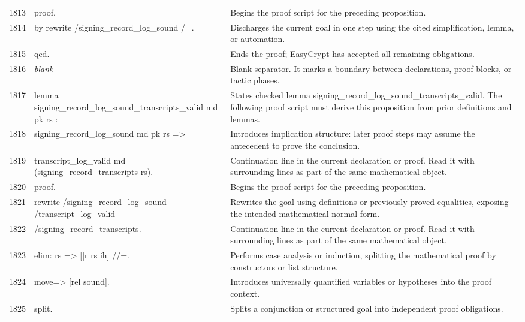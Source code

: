 \documentclass[10pt]{article}
\begin{document}
\begin{longtable}{r L{0.53\textwidth} L{0.37\textwidth}}
1813 & {\ttfamily\scriptsize proof.} & Begins the proof script for the preceding proposition. \\
1814 & {\ttfamily\scriptsize by rewrite /signing\_record\_log\_sound /=.} & Discharges the current goal in one step using the cited simplification, lemma, or automation. \\
1815 & {\ttfamily\scriptsize qed.} & Ends the proof; EasyCrypt has accepted all remaining obligations. \\
1816 & {\ttfamily\scriptsize \emph{blank}} & Blank separator.  It marks a boundary between declarations, proof blocks, or tactic phases. \\
1817 & {\ttfamily\scriptsize lemma signing\_record\_log\_sound\_transcripts\_valid md pk rs :} & States checked lemma signing\_record\_log\_sound\_transcripts\_valid.  The following proof script must derive this proposition from prior definitions and lemmas. \\
1818 & {\ttfamily\scriptsize   signing\_record\_log\_sound md pk rs =>} & Introduces implication structure: later proof steps may assume the antecedent to prove the conclusion. \\
1819 & {\ttfamily\scriptsize   transcript\_log\_valid md (signing\_record\_transcripts rs).} & Continuation line in the current declaration or proof.  Read it with surrounding lines as part of the same mathematical object. \\
1820 & {\ttfamily\scriptsize proof.} & Begins the proof script for the preceding proposition. \\
1821 & {\ttfamily\scriptsize rewrite /signing\_record\_log\_sound /transcript\_log\_valid} & Rewrites the goal using definitions or previously proved equalities, exposing the intended mathematical normal form. \\
1822 & {\ttfamily\scriptsize         /signing\_record\_transcripts.} & Continuation line in the current declaration or proof.  Read it with surrounding lines as part of the same mathematical object. \\
1823 & {\ttfamily\scriptsize elim: rs => [|r rs ih] //=.} & Performs case analysis or induction, splitting the mathematical proof by constructors or list structure. \\
1824 & {\ttfamily\scriptsize move=> [rel sound].} & Introduces universally quantified variables or hypotheses into the proof context. \\
1825 & {\ttfamily\scriptsize split.} & Splits a conjunction or structured goal into independent proof obligations. \\

\end{longtable}
\end{document}
